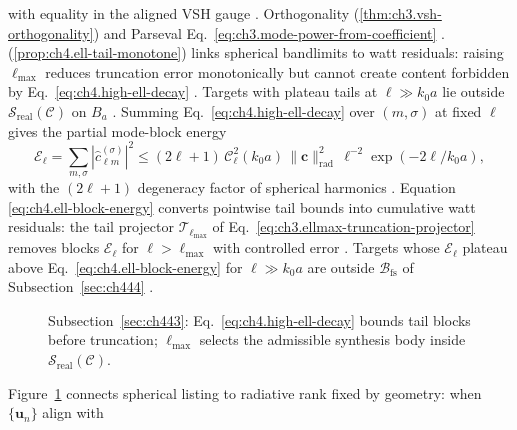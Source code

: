 with equality in the aligned VSH gauge \cite{hansen1988}.
Orthogonality (\ref{thm:ch3.vsh-orthogonality}) and Parseval
Eq.~\eqref{eq:ch3.mode-power-from-coefficient} \cite{hansen1988}.
(\ref{prop:ch4.ell-tail-monotone}) links spherical bandlimits to watt residuals: raising \(\ell_{\max}\)
reduces truncation error monotonically but cannot create content forbidden by Eq.~\eqref{eq:ch4.high-ell-decay}
\cite{harrington2001}. Targets with plateau tails at \(\ell\gg k_{0}a\) lie outside
\(\mathcal{S}_{\mathrm{real}}(\mathcal{C})\) on \(B_{a}\) \cite{jackson1999}.
Summing Eq.~\eqref{eq:ch4.high-ell-decay} over \((m,\sigma)\) at fixed \(\ell\) gives the partial mode-block energy
\begin{equation}
\label{eq:ch4.ell-block-energy}
\mathcal{E}_{\ell}
=
\sum_{m,\sigma}|\widehat{c}_{\ell m}^{(\sigma)}|^{2}
\le
(2\ell+1)\,\mathcal{C}_{\ell}^{2}(k_{0}a)\,\|\mathbf{c}\|_{\mathrm{rad}}^{2}\,
\ell^{-2}\exp(-2\ell/k_{0}a),
\end{equation}
with the \((2\ell+1)\) degeneracy factor of spherical harmonics \cite{hansen1988}. Equation
\eqref{eq:ch4.ell-block-energy} converts pointwise tail bounds into cumulative watt residuals: the tail projector
\(\mathcal{T}_{\ell_{\max}}\) of Eq.~\eqref{eq:ch3.ellmax-truncation-projector} removes blocks \(\mathcal{E}_{\ell}\)
for \(\ell>\ell_{\max}\) with controlled error \cite{hansen1988}. Targets whose \(\mathcal{E}_{\ell}\) plateau above
Eq.~\eqref{eq:ch4.ell-block-energy} for \(\ell\gg k_{0}a\) are outside \(\mathcal{B}_{\mathrm{fs}}\) of
Subsection~\ref{sec:ch444} \cite{devaney2004}.
\begin{figure}[t]
\centering
{}
\caption{Subsection~\ref{sec:ch443}: Eq.~\eqref{eq:ch4.high-ell-decay} bounds tail blocks before truncation;
\(\ell_{\max}\) selects the admissible synthesis body inside \(\mathcal{S}_{\mathrm{real}}(\mathcal{C})\).}
\label{fig:ch4.high-ell-tail}
\end{figure}
Figure~\ref{fig:ch4.high-ell-tail} connects spherical listing to radiative rank fixed by geometry: when \(\{\mathbf{u}_{n}\}\) align with
